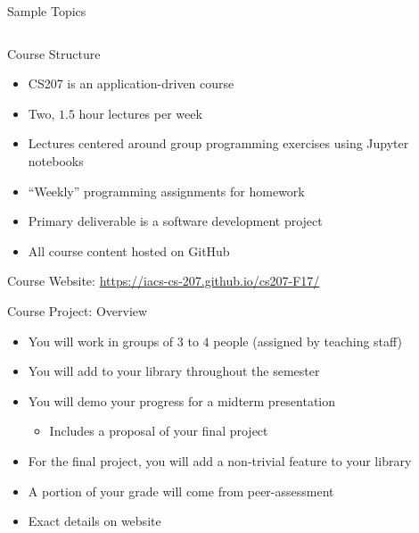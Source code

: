\documentclass[onlymath, nologo]{beamer}
\begin{document}
\begin{frame}{Sample Topics}
{\begin{columns}[b]
\begin{column}{0.5\textwidth}
        \end{column}
      \end{columns}
    }
  \end{frame}

  \begin{frame}{Course Structure}
    \begin{itemize}
      \item CS207 is an application-driven course \\[0.5em]
      \item Two, $1.5$ hour lectures per week \\[0.5em]
      \item Lectures centered around group programming exercises using Jupyter notebooks  \\[0.5em]
      \item ``Weekly'' programming assignments for homework \\[0.5em]
      \item Primary deliverable is a software development project \\[0.5em]
      \item All course content hosted on GitHub
    \end{itemize}
    \vfill
    \centering
    \Large Course Website:  \url{https://iacs-cs-207.github.io/cs207-F17/}
  \end{frame}

  \begin{frame}{Course Project:  Overview}
    \begin{itemize}
      \item You will work in groups of $3$ to $4$ people (assigned by teaching staff) \\[0.75em]
      \item You will add to your library throughout the semester \\[0.75em]
      \item You will demo your progress for a midterm presentation  \\[0.25em]
        \begin{itemize}
          \item Includes a proposal of your final project \\[0.75em]
        \end{itemize}
      \item For the final project, you will add a non-trivial feature to your library \\[0.75em]
      \item A portion of your grade will come from peer-assessment \\[0.75em]
      \item Exact details on website
    \end{itemize}
  \end{frame}
\end{document}
